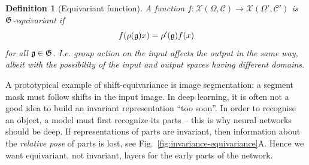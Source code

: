 \documentclass[11pt]{article}
\numberwithin{equation}{section}
\newtheorem{defn}{Definition}[section]
\begin{document}
\begin{defn}[Equivariant function]
A function $f: \mathcal{X}(\Omega, \mathcal{C}) \rightarrow \mathcal{X}(\Omega', \mathcal{C}')$ is $\mathfrak{G}$-equivariant if 
\begin{equation}
f(\rho(\mathfrak{g})x) = \rho'(\mathfrak{g})f(x) \label{eq:equivariant-fcn}
\end{equation}
for all $\mathfrak{g} \in \mathfrak{G}$. I.e. group action on the input affects the output in the same way, albeit with the possibility of the input and output spaces having different domains.
\end{defn}

A prototypical example of shift-equivariance is image segmentation: a segment mask must follow shifts in the input image. In deep learning, it is often not a good idea to build an invariant representation ``too soon''. In order to recognise an object, a model must first recognize its parts -- this is why neural networks should be deep. If representations of parts are invariant, then information about the \textit{relative pose} of parts is lost, see Fig.~\ref{fig:invariance-equivariance}A. Hence we want equivariant, not invariant, layers for the early parts of the network.
\end{document}
